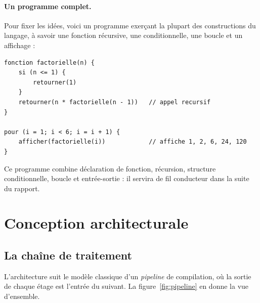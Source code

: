 \paragraph{Un programme \ilang{} complet.} Pour fixer les idées, voici un
programme exerçant la plupart des constructions du langage, à savoir une fonction
récursive, une conditionnelle, une boucle et un affichage :

\begin{lstlisting}[style=ilang,caption={Exemple : factorielle récursive et boucle d'affichage.}]
fonction factorielle(n) {
    si (n <= 1) {
        retourner(1)
    }
    retourner(n * factorielle(n - 1))   // appel recursif
}

pour (i = 1; i < 6; i = i + 1) {
    afficher(factorielle(i))            // affiche 1, 2, 6, 24, 120
}
\end{lstlisting}

Ce programme combine déclaration de fonction, récursion, structure
conditionnelle, boucle  et entrée-sortie : il servira de fil
conducteur dans la suite du rapport.

\section{Conception architecturale}

\subsection{La chaîne de traitement}

L'architecture suit le modèle classique d'un \emph{pipeline} de compilation, où la
sortie de chaque étage est l'entrée du suivant. La
figure~\ref{fig:pipeline} en donne la vue d'ensemble.

